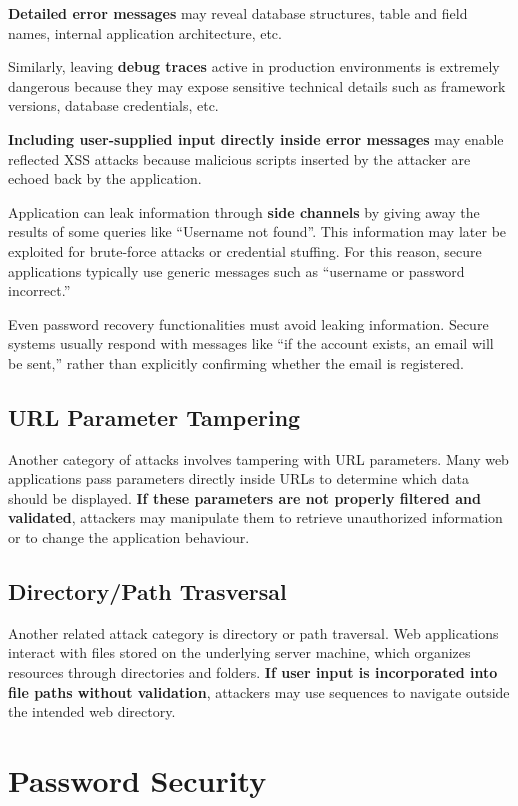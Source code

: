 \documentclass{article}
\begin{document}
\textbf{Detailed error messages} may reveal database structures, table and field names, internal application architecture, etc.

Similarly, leaving \textbf{debug traces} active in production environments is extremely dangerous because they may expose sensitive technical details such as framework versions, database credentials, etc.

\textbf{Including user-supplied input directly inside error messages} may enable reflected XSS attacks because malicious scripts inserted by the attacker are echoed back by the application.

Application can leak information through \textbf{side channels} by giving away the results of some queries like ``Username not found''. This information may later be exploited for brute-force attacks or credential stuffing. For this reason, secure applications typically use generic messages such as ``username or password incorrect.''

Even password recovery functionalities must avoid leaking information. Secure systems usually respond with messages like ``if the account exists, an email will be sent,'' rather than explicitly confirming whether the email is registered.

\subsection{URL Parameter Tampering}

Another category of attacks involves tampering with URL parameters. Many web applications pass parameters directly inside URLs to determine which data should be displayed. \textbf{If these parameters are not properly filtered and validated}, attackers may manipulate them to retrieve unauthorized information or to change the application behaviour.

\subsection{Directory/Path Trasversal}

Another related attack category is directory or path traversal. Web applications interact with files stored on the underlying server machine, which organizes resources through directories and folders. \textbf{If user input is incorporated into file paths without validation}, attackers may use sequences to navigate outside the intended web directory.

\section{Password Security}
\end{document}
